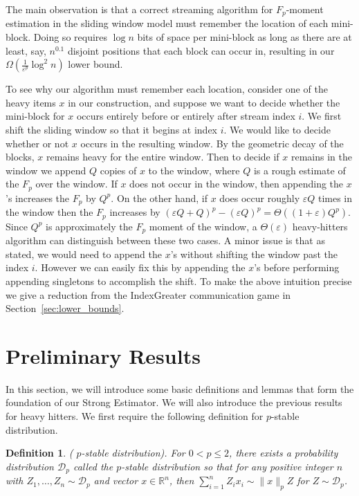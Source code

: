 \documentclass{article}
\newcommand{\estt}{\textsf{Strong Estimator}}
\newcommand{\eps}{\varepsilon}
\theoremstyle{plain}
\newtheorem{defn}[theorem]{Definition}
\begin{document}
The main observation is that a correct streaming algorithm for $F_p$-moment estimation in the sliding window model must remember the location of each mini-block. Doing so requires $\log n$ bits of space per mini-block as long as there are at least, say, $n^{0.1}$ disjoint positions that each block can occur in, resulting in our $\Omega(\frac{1}{\eps^p}\log^2 n)$ lower bound.

To see why our algorithm must remember each location, consider one of the heavy items $x$ in our construction, and suppose we want to decide whether the mini-block for $x$ occurs entirely before or entirely after stream index $i.$  We first shift the sliding window so that it begins at index $i$.  We would like to decide whether or not $x$ occurs in the resulting window.  By the geometric decay of the blocks, $x$ remains heavy for the entire window. Then to decide if $x$ remains in the window we append $Q$ copies of $x$ to the window, where $Q$ is a rough estimate of the $F_p$ over the window.  If $x$ does not occur in the window, then appending the $x$'s increases the $F_p$ by $Q^p.$  On the other hand, if $x$ does occur roughly $\eps Q$ times in the window then the $F_p$ increases by $(\eps Q + Q)^p - (\eps Q)^p = \Theta((1 + \eps)Q^p).$ Since $Q^p$ is approximately the $F_p$ moment of the window, a $\Theta(\eps)$ heavy-hitters algorithm can distinguish between these two cases.  A minor issue is that as stated, we would need to append the $x$'s without shifting the window past the index $i$. 
 However we can easily fix this by appending the $x$'s before performing appending singletons to accomplish the shift.  To make the above intuition precise we give a reduction from the IndexGreater communication game in Section~\ref{sec:lower_bounds}.  %
 
\section{Preliminary Results}



In this section, we will introduce some basic definitions and lemmas that form the foundation of our \estt. We will also introduce the previous results for heavy hitters. We first require the following definition for $p$-stable distribution. 

\begin{defn}( $p$-stable distribution).\cite{zolotarev1986one} For $0<p \leq 2$, there exists a probability distribution $\mathcal{D}_p$ called the $p$-stable distribution so that for any positive integer $n$ with $Z_1, \ldots, Z_n \sim \mathcal{D}_p$ and vector $x \in \mathbb{R}^n$, then $\sum_{i=1}^n Z_i x_i \sim\|x\|_p Z$ for $Z \sim \mathcal{D}_p$.
\end{defn}
\end{document}
